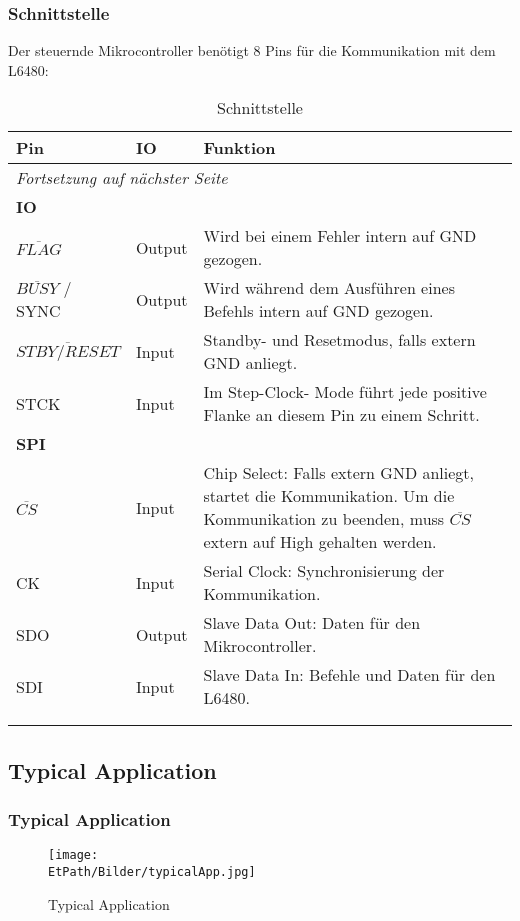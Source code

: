 		 \subsubsection{Schnittstelle}
		 \fi
	  		Der steuernde Mikrocontroller benötigt 8 Pins für die Kommunikation mit dem L6480: 
	  		\begin{longtable}{l l p{7cm}} \toprule
	  			\textbf{Pin} 	& \textbf{IO} 	& \textbf{Funktion} \\
	  			\midrule
	  			\endhead
	  			\multicolumn{3}{l}{\emph{Fortsetzung auf nächster Seite}} \\ \bottomrule \endfoot \endlastfoot 			
	  			\textbf{IO}\\ \addlinespace
	  			$\overline{FLAG}$& Output 				& Wird bei einem Fehler intern auf GND gezogen. \\ \addlinespace
	  			$\overline{BUSY}$ / SYNC & Output		& Wird während dem Ausführen eines Befehls intern auf GND gezogen.\\ \addlinespace
	  			$\overline{STBY / RESET}$& Input		& Standby- und Resetmodus, falls extern GND anliegt. \\ \addlinespace
	  			STCK			& Input			& Im Step-Clock- Mode führt jede positive Flanke an diesem Pin zu einem Schritt. \\ \addlinespace
	  			\textbf{SPI}\\ \addlinespace
	  			$\overline{CS}$	& Input			& Chip Select: Falls extern GND anliegt, startet die Kommunikation. Um die Kommunikation zu beenden, muss $\overline{CS}$ extern auf High gehalten werden. \\ \addlinespace
	  			CK				& Input			& Serial Clock: Synchronisierung der Kommunikation. \\ \addlinespace
	  			SDO				& Output		& Slave Data Out: Daten für den Mikrocontroller. \\ \addlinespace
	  			SDI				& Input			& Slave Data In: Befehle und Daten für den L6480. \\ \addlinespace
	  			\bottomrule
	  			\\
	  			\caption{Schnittstelle} 
	  			\label{Schnittstelle}
	  		\end{longtable}	
	  	\ifSTANDALONE	
	 	\subsection{Typical Application}
	 	\fi
	 	\ifEMBED
	 	\subsubsection{Typical Application}
	 	\fi
			 	\begin{figure}[h]
			 		\centering
			 		\texttt{[image: \\EtPath/Bilder/typicalApp.jpg]}
			 		\label{fig:typApp}
			 		\caption[Typical Application]{Typical Application \cite{Datasheet:L6480}}
			 	\end{figure}